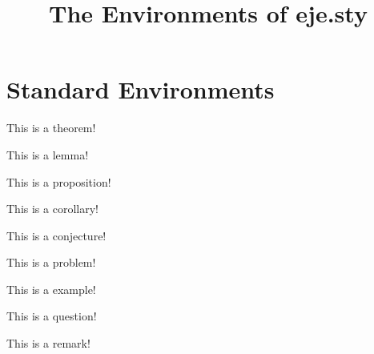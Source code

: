 \documentclass{scrartcl}
\title{The Environments of eje.sty}
\begin{document}
\maketitle



\section{Standard Environments}

\begin{theorem}
    This is a theorem!
\end{theorem}
\begin{lemma}
    This is a lemma!
\end{lemma}
\begin{proposition}
    This is a proposition!
\end{proposition}
\begin{corollary}
    This is a corollary!
\end{corollary}
\begin{conjecture}
    This is a conjecture!
\end{conjecture}
\begin{problem}
    This is a problem!
\end{problem}
\begin{example}
    This is a example!
\end{example}
\begin{question}
    This is a question!
\end{question}
\begin{remark}
    This is a remark!
\end{remark}

\newpage
\end{document}
